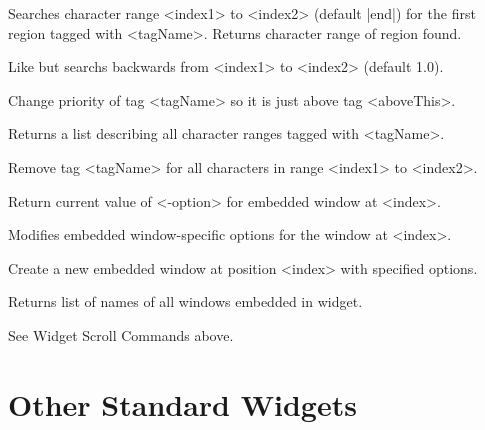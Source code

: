 \begin{enum}{1cm}
Searches character range <index1> to <index2> (default |end|) for the first
region tagged with <tagName>. Returns character range of region found.

Like  but searchs backwards from <index1> to 
<index2> (default 1.0).

Change priority of tag <tagName> so it is just above tag <aboveThis>.

Returns a list describing all character ranges tagged with <tagName>.

Remove tag <tagName> for all characters in range <index1> to <index2>.

Return current value of <-option> for embedded window at <index>.

Modifies embedded window-specific options for the window at <index>.

Create a new embedded window at position <index> with specified options.

Returns list of names of all windows embedded in widget.

See Widget Scroll Commands above.

\end{enum}


\section{Other Standard Widgets}

